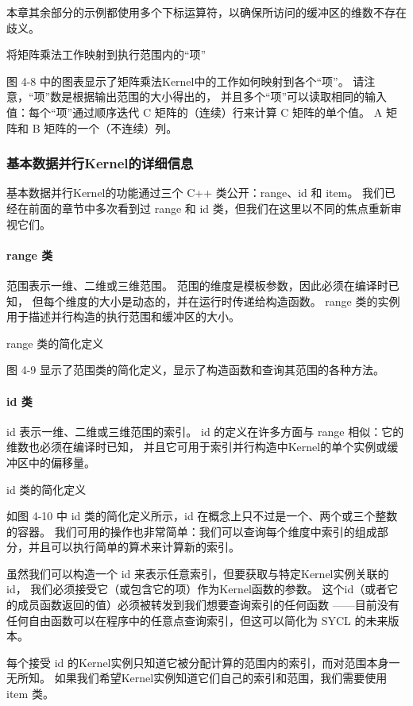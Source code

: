 本章其余部分的示例都使用多个下标运算符，以确保所访问的缓冲区的维数不存在歧义。

{\color{red} 将矩阵乘法工作映射到执行范围内的“项”}

图 4-8 中的图表显示了矩阵乘法Kernel中的工作如何映射到各个“项”。 
请注意，“项”数是根据输出范围的大小得出的，
并且多个“项”可以读取相同的输入值：每个“项”通过顺序迭代 C 矩阵的（连续）行来计算 C 矩阵的单个值。 
A 矩阵和 B 矩阵的一个（不连续）列。

\subsubsection{基本数据并行Kernel的详细信息}
基本数据并行Kernel的功能通过三个 C++ 类公开：range、id 和 item。 
我们已经在前面的章节中多次看到过 range 和 id 类，但我们在这里以不同的焦点重新审视它们。

\paragraph{range 类}

范围表示一维、二维或三维范围。 范围的维度是模板参数，因此必须在编译时已知，
但每个维度的大小是动态的，并在运行时传递给构造函数。 range 类的实例用于描述并行构造的执行范围和缓冲区的大小。

{\color{red} range 类的简化定义}

图 4-9 显示了范围类的简化定义，显示了构造函数和查询其范围的各种方法。

\paragraph{id 类}

id 表示一维、二维或三维范围的索引。 
id 的定义在许多方面与 range 相似：它的维数也必须在编译时已知，
并且它可用于索引并行构造中Kernel的单个实例或缓冲区中的偏移量。

{\color{red} id 类的简化定义}

如图 4-10 中 id 类的简化定义所示，id 在概念上只不过是一个、两个或三个整数的容器。 
我们可用的操作也非常简单：我们可以查询每个维度中索引的组成部分，并且可以执行简单的算术来计算新的索引。

虽然我们可以构造一个 id 来表示任意索引，但要获取与特定Kernel实例关联的 id，
我们必须接受它（或包含它的项）作为Kernel函数的参数。 
这个id（或者它的成员函数返回的值）必须被转发到我们想要查询索引的任何函数
——目前没有任何自由函数可以在程序中的任意点查询索引，但这可以简化为 SYCL 的未来版本。

每个接受 id 的Kernel实例只知道它被分配计算的范围内的索引，而对范围本身一无所知。 
如果我们希望Kernel实例知道它们自己的索引和范围，我们需要使用 item 类。

